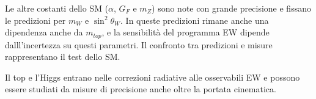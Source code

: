 Le altre costanti dello SM ($\alpha$, $G_F$ e $m_Z$) sono note con grande precisione e fissano le predizioni per $m_W$ e $\sin^2\theta_W$. In queste predizioni rimane anche una dipendenza anche da $m_{top}$, e la sensibilità del programma EW dipende dalll'incertezza su questi parametri. Il confronto tra predizioni e misure rappresentano il test dello SM.

Il top e l'Higgs entrano nelle correzioni radiative alle osservabili EW e possono essere studiati da misure di precisione anche oltre la portata cinematica.


